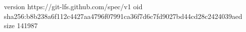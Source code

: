 version https://git-lfs.github.com/spec/v1
oid sha256:b8b238a6f112c4427aa4796f07991ca36f7d6c7fd9027bd44cd28c2424039aed
size 141987
